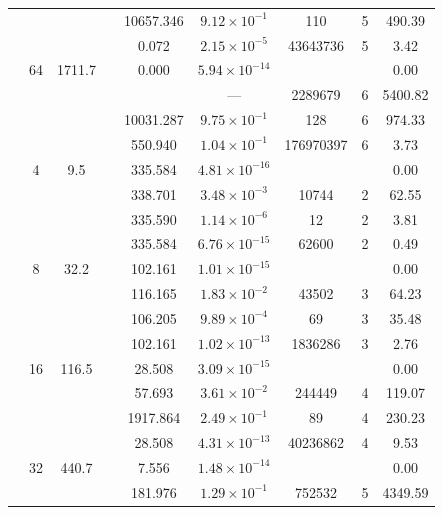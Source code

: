 \begin{table}[htbp]
\begin{tabular}{l S[table-format=3.0] S[table-format=4.1] l S[table-format=3.3] S[table-format=1.2e2] S[table-format=6.0] S[table-format=2.0] S[table-format=4.2]}
     &  &  &  & 10657.346 & $9.12 \times 10^{-1}$ & 110 & 5 & 490.39 \\
     &  &  &  & 0.072 & $2.15 \times 10^{-5}$ & 43643736 & 5 & 3.42 \\
     & 64 & 1711.7 &  & 0.000 & $5.94 \times 10^{-14}$ & {\text{---}} & {\text{---}} & 0.00 \\
     &  &  &  & {\text{---}} & ${\text{---}}$ & 2289679 & 6 & 5400.82 \\
     &  &  &  & 10031.287 & $9.75 \times 10^{-1}$ & 128 & 6 & 974.33 \\
     &  &  &  & 550.940 & $1.04 \times 10^{-1}$ & 176970397 & 6 & 3.73 \\
    \midrule
     & 4 & 9.5 &  & 335.584 & $4.81 \times 10^{-16}$ & {\text{---}} & {\text{---}} & 0.00 \\
     &  &  &  & 338.701 & $3.48 \times 10^{-3}$ & 10744 & 2 & 62.55 \\
     &  &  &  & 335.590 & $1.14 \times 10^{-6}$ & 12 & 2 & 3.81 \\
     &  &  &  & 335.584 & $6.76 \times 10^{-15}$ & 62600 & 2 & 0.49 \\
     & 8 & 32.2 &  & 102.161 & $1.01 \times 10^{-15}$ & {\text{---}} & {\text{---}} & 0.00 \\
     &  &  &  & 116.165 & $1.83 \times 10^{-2}$ & 43502 & 3 & 64.23 \\
     &  &  &  & 106.205 & $9.89 \times 10^{-4}$ & 69 & 3 & 35.48 \\
     &  &  &  & 102.161 & $1.02 \times 10^{-13}$ & 1836286 & 3 & 2.76 \\
     & 16 & 116.5 &  & 28.508 & $3.09 \times 10^{-15}$ & {\text{---}} & {\text{---}} & 0.00 \\
     &  &  &  & 57.693 & $3.61 \times 10^{-2}$ & 244449 & 4 & 119.07 \\
     &  &  &  & 1917.864 & $2.49 \times 10^{-1}$ & 89 & 4 & 230.23 \\
     &  &  &  & 28.508 & $4.31 \times 10^{-13}$ & 40236862 & 4 & 9.53 \\
     & 32 & 440.7 &  & 7.556 & $1.48 \times 10^{-14}$ & {\text{---}} & {\text{---}} & 0.00 \\
     &  &  &  & 181.976 & $1.29 \times 10^{-1}$ & 752532 & 5 & 4349.59 \\

\end{tabular}
\end{table}
